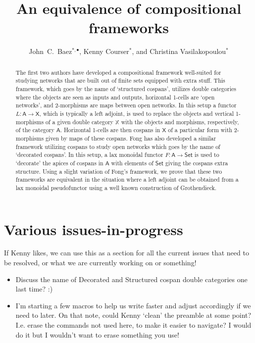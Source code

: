 \documentclass{amsart}
\title{An equivalence of compositional frameworks}
\author{John\ C.\ Baez$^{*,\bullet}$, Kenny Courser$^*$, and Christina Vasilakopoulou$^*$}
\begin{document}
\begin{abstract}
\noindent
The first two authors have developed a compositional framework well-suited for studying networks that are built out of finite sets equipped with extra stuff. This framework, which goes by the name of `structured cospans', utilizes double categories where the objects are seen as inputs and outputs, horizontal 1-cells are `open networks', and 2-morphisms are maps between open networks. In this setup a functor $L \colon \textsf{A} \to \textsf{X}$, which is typically a left adjoint, is used to replace the objects and vertical 1-morphisms of a given double category $\mathbb{X}$ with the objects and morphisms, respectively, of the category $\textsf{A}$. Horizontal 1-cells are then cospans in $\textsf{X}$ of a particular form with 2-morphisms given by maps of these cospans. Fong has also developed a similar framework utilizing cospans to study open networks which goes by the name of `decorated cospans'. In this setup, a lax monoidal functor $F \colon \textsf{A} \to \textsf{Set}$ is used to `decorate' the apices of cospans in $\textsf{A}$ with elements of $\textsf{Set}$ giving the cospans extra structure. Using a slight variation of Fong's framework, we prove that these two frameworks are equivalent in the situation where a left adjoint can be obtained from a lax monoidal pseudofunctor using a well known construction of Grothendieck.
\end{abstract}

\maketitle

\setcounter{tocdepth}{1} %
\tableofcontents

\section*{Various issues-in-progress}
{\chris If Kenny likes, we can use this as a section for all the current issues that need to be resolved, or what we are currently working on or something!}
\begin{itemize}
\item {\chris Discuss the name of Decorated and Structured cospan double categories one last time? :)}
\item {\chris I'm starting a few macros to help us write faster and adjust accordingly if we need to later. On that note, could Kenny `clean' the preamble at some point? I.e. erase the commands not used here, to make it easier to navigate? I would do it but I wouldn't want to erase something you use!}
\end{itemize}
\end{document}
